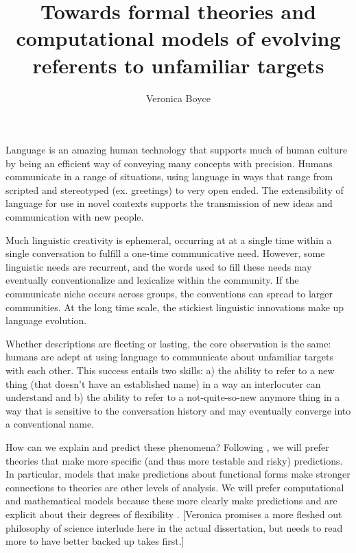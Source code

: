 \documentclass[]{article}
\title{Towards formal theories and computational models of evolving referents to unfamiliar targets}
\author{Veronica Boyce}
\begin{document}
	
	\maketitle
	
	

	
	Language is an amazing human technology that supports much of human culture by being an efficient way of conveying many concepts with precision. Humans communicate in a range of situations, using language in ways that range from scripted and stereotyped (ex. greetings) to very open ended. The extensibility of language for use in novel contexts supports the transmission of new ideas and communication with new people. 
	
	Much linguistic creativity is ephemeral, occurring at at a single time within a single conversation to fulfill a one-time communicative need.  However, some linguistic needs are recurrent, and the words used to fill these needs may eventually conventionalize and lexicalize within the community. If the communicate niche occurs across groups, the conventions can spread to larger communities.  At the long time scale, the stickiest linguistic innovations make up language evolution. 
	
	Whether descriptions are fleeting or lasting, the core observation is the same: humans are adept at using language to communicate about unfamiliar targets with each other. This success entails two skills: a) the ability to refer to a new thing (that doesn't have an established name) in a way an interlocuter can understand and b) the ability to refer to a not-quite-so-new anymore thing in a way that is sensitive to the conversation history and may eventually converge into a conventional name. 
	
	How can we explain and predict these phenomena? Following \cite{meehl1990}, we will prefer theories that make more specific (and thus more testable and risky) predictions. In particular, models that make predictions about functional forms make stronger connections to theories are other levels of analysis. We will prefer computational and mathematical models because these more clearly make predictions and are explicit about their degrees of flexibility \cite{yarkoni2017}. [Veronica promises a more fleshed out philosophy of science interlude here in the actual dissertation, but needs to read more to have better backed up takes first.]
	
	
\end{document}
